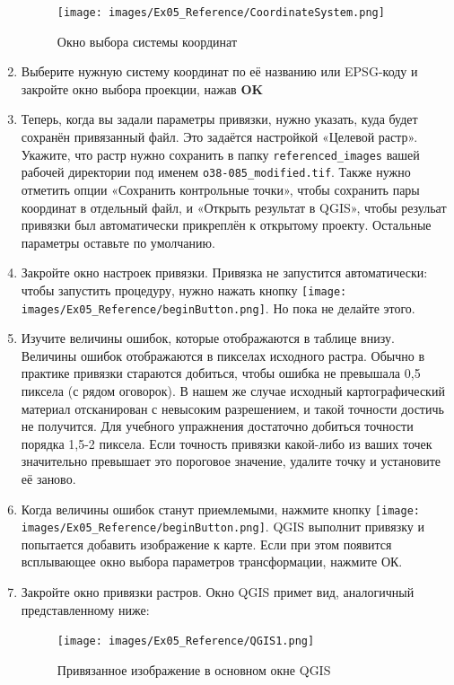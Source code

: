 \documentclass[
  12pt,
]{book}
\begin{document}
\begin{enumerate}
  \begin{figure}
  \centering
  \texttt{[image: images/Ex05\_Reference/CoordinateSystem.png]}
  \caption{Окно выбора системы координат}
  \end{figure}
\item
  Выберите нужную систему координат по её названию или EPSG-коду и закройте окно выбора проекции, нажав \textbf{OK}
\item
  Теперь, когда вы задали параметры привязки, нужно указать, куда будет сохранён привязанный файл. Это задаётся настройкой «Целевой растр». Укажите, что растр нужно сохранить в папку \texttt{referenced\_images} вашей рабочей директории под именем \texttt{o38-085\_modified.tif}. Также нужно отметить опции «Сохранить контрольные точки», чтобы сохранить пары координат в отдельный файл, и «Открыть результат в QGIS», чтобы резульат привязки был автоматически прикреплён к открытому проекту. Остальные параметры оставьте по умолчанию.
\item
  Закройте окно настроек привязки. Привязка не запустится автоматически: чтобы запустить процедуру, нужно нажать кнопку \texttt{[image: images/Ex05\_Reference/beginButton.png]}. Но пока не делайте этого.
\item
  Изучите величины ошибок, которые отображаются в таблице внизу. Величины ошибок отображаются в пикселах исходного растра. Обычно в практике привязки стараются добиться, чтобы ошибка не превышала 0,5 пиксела (с рядом оговорок). В нашем же случае исходный картографический материал отсканирован с невысоким разрешением, и такой точности достичь не получится. Для учебного упражнения достаточно добиться точности порядка 1,5-2 пиксела. Если точность привязки какой-либо из ваших точек значительно превышает это пороговое значение, удалите точку и установите её заново.
\item
  Когда величины ошибок станут приемлемыми, нажмите кнопку \texttt{[image: images/Ex05\_Reference/beginButton.png]}. QGIS выполнит привязку и попытается добавить изображение к карте. Если при этом появится всплывающее окно выбора параметров трансформации, нажмите ОК.
\item
  Закройте окно привязки растров. Окно QGIS примет вид, аналогичный представленному ниже:

  \begin{figure}
  \centering
  \texttt{[image: images/Ex05\_Reference/QGIS1.png]}
  \caption{Привязанное изображение в основном окне QGIS}
  \end{figure}


\end{enumerate}
\end{document}
